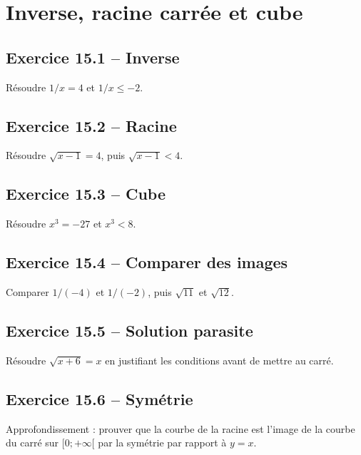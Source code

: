 \chapter{Inverse, racine carrée et cube}
\section*{Exercice 15.1 -- Inverse}
Résoudre $1/x=4$ et $1/x\leq-2$.

\section*{Exercice 15.2 -- Racine}
Résoudre $\sqrt{x-1}=4$, puis $\sqrt{x-1}<4$.

\section*{Exercice 15.3 -- Cube}
Résoudre $x^3=-27$ et $x^3<8$.

\section*{Exercice 15.4 -- Comparer des images}
Comparer $1/(-4)$ et $1/(-2)$, puis $\sqrt{11}$ et $\sqrt{12}$.

\section*{Exercice 15.5 -- Solution parasite}
Résoudre $\sqrt{x+6}=x$ en justifiant les conditions avant de mettre au carré.

\section*{Exercice 15.6 -- Symétrie}
Approfondissement : prouver que la courbe de la racine est l'image de la courbe du carré sur $[0;+\infty[$ par la symétrie par rapport à $y=x$.
